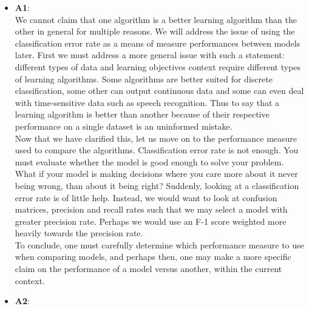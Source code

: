 \begin{itemize}


\item \textbf{A1}:\\
  We cannot claim that one algorithm is a better learning algorithm than the other in general for multiple reasons.
  We will address the issue of using the classification error rate as a means of measure performances between models later.
  First we must address a more general issue with such a statement:
  different types of data and learning objectives context require different types of learning algorithms.
  Some algorithms are better suited for discrete classification, some other can output continuous data and some can even deal with 
  time-sensitive data such as speech recognition.
  Thus to say that a learning algorithm is better than another because of their respective performance on a single dataset is an uninformed mistake.\\
  Now that we have clarified this, let us move on to the performance measure used to compare the algorithms.
  Classification error rate is not enough.
  You must evaluate whether the model is good enough to solve your problem.
  What if your model is making decisions where you care more about it never being wrong, than about it being right?
  Suddenly, looking at a classification error rate is of little help.
  Instead, we would want to look at confusion matrices, precision and recall rates such that we may select a model with greater
  precision rate.
  Perhaps we would use an F-1 score weighted more heavily towards the precision rate.\\
  To conclude, one must carefully determine which performance measure to use when comparing models, and perhaps then, one may make
  a more specific claim on the performance of a model versus another, within the current context.
  
\item \textbf{A2}:\\

\end{itemize}
